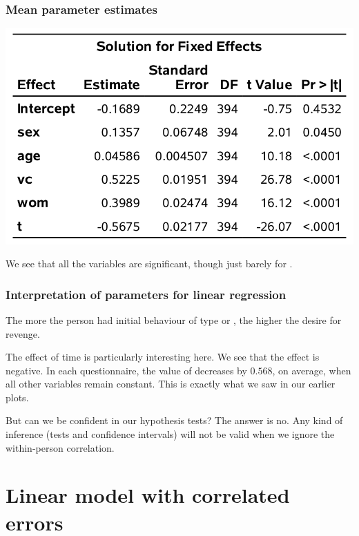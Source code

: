 \documentclass{beamer}
\begin{document}
 \begin{frame}
\frametitle{Mean parameter estimates}
\begin{center}
\includegraphics[width = 0.7\linewidth]{img/c5/slides6-e05}
\end{center}
We see that all the variables are significant, though just barely for .
\end{frame}

 \begin{frame}
\frametitle{Interpretation of parameters for linear regression}
\bi
\item The more the person had initial behaviour of type  or , the higher the desire for revenge. 
\item The effect of time is particularly interesting here. We see that the effect is negative. In each questionnaire, the value of  decreases by $0.568$, on average, when all other variables remain constant. This is exactly what we saw in our earlier plots.
\item \alert{But can we be confident in our hypothesis tests?} The answer is no. Any kind of inference (tests and confidence intervals) will not be valid when we ignore the within-person correlation.
\ei
\end{frame}


\section{Linear model with correlated errors}
\end{document}
